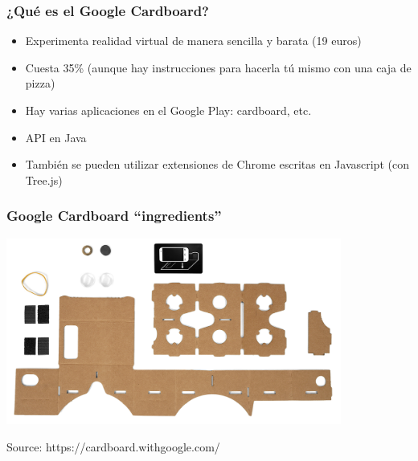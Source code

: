 
\begin{frame}
\frametitle{¿Qué es el Google Cardboard?}

\begin{itemize}
   \item Experimenta realidad virtual de manera sencilla y barata (19 euros)
   \item Cuesta 35\% (aunque hay instrucciones para hacerla tú mismo con una caja de pizza)
   \item Hay varias aplicaciones en el Google Play: cardboard, etc.
   \item API en Java
   \item También se pueden utilizar extensiones de Chrome escritas en Javascript (con Tree.js)
\end{itemize}

\end{frame}



\begin{frame}
\frametitle{Google Cardboard ``ingredients''}

\begin{center}
  \includegraphics[width=11cm]{figs/ingredients.png}
\end{center}


\begin{flushright}
{\tiny
Source: https://cardboard.withgoogle.com/
}
\end{flushright}

\end{frame}



